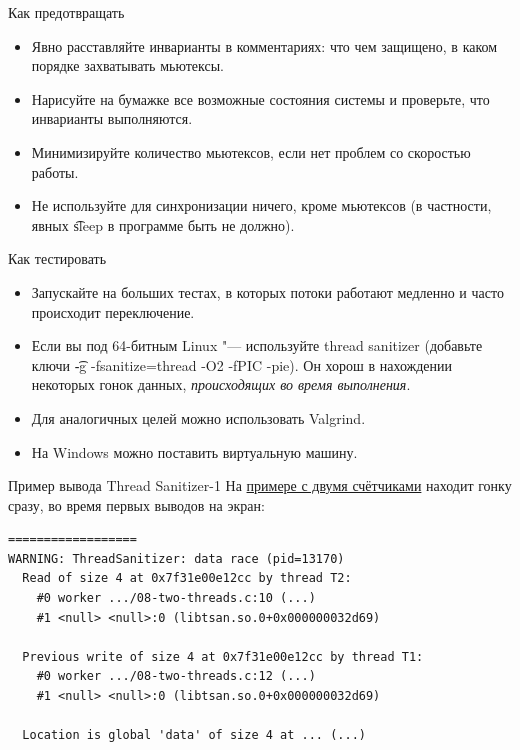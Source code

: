 \begin{frame}{Как предотвращать}
	\begin{itemize}
		\item Явно расставляйте инварианты в комментариях: что чем защищено, в каком порядке захватывать мьютексы.
		\item Нарисуйте на бумажке все возможные состояния системы и проверьте, что инварианты выполняются.
		\item Минимизируйте количество мьютексов, если нет проблем со скоростью работы.
		\item Не используйте для синхронизации ничего, кроме мьютексов (в частности, явных \t{sleep} в программе быть не должно).
	\end{itemize}
\end{frame}

\begin{frame}{Как тестировать}
	\begin{itemize}
		\item Запускайте на больших тестах, в которых потоки работают медленно и часто происходит переключение.
		\item
			Если вы под 64-битным Linux "--- используйте thread sanitizer (добавьте ключи \t{-g -fsanitize=thread -O2 -fPIC -pie}).
			Он хорош в нахождении некоторых гонок данных, \textit{происходящих во время выполнения}.
		\item
			Для аналогичных целей можно использовать Valgrind.
		\item
			На Windows можно поставить виртуальную машину.
	\end{itemize}
\end{frame}

\begin{frame}[fragile]{Пример вывода Thread Sanitizer-1}
	На \href{https://github.com/yeputons/fall-2016-paradigms/raw/master/161019/sources/08-two-threads.c}{примере с двумя счётчиками} находит гонку сразу,
	во время первых выводов на экран:
\begin{verbatim}
==================
WARNING: ThreadSanitizer: data race (pid=13170)
  Read of size 4 at 0x7f31e00e12cc by thread T2:
    #0 worker .../08-two-threads.c:10 (...)
    #1 <null> <null>:0 (libtsan.so.0+0x000000032d69)

  Previous write of size 4 at 0x7f31e00e12cc by thread T1:
    #0 worker .../08-two-threads.c:12 (...)
    #1 <null> <null>:0 (libtsan.so.0+0x000000032d69)

  Location is global 'data' of size 4 at ... (...)
\end{verbatim}
\end{frame}

